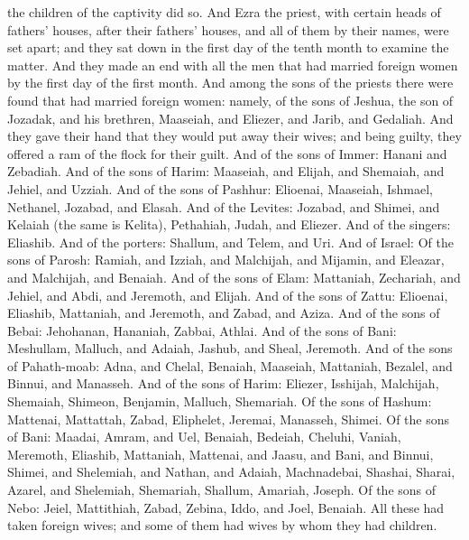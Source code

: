 the children of the captivity did so. And Ezra the priest, with certain heads of fathers’ houses, after their fathers’ houses, and all of them by their names, were set apart; and they sat down in the first day of the tenth month to examine the matter. And they made an end with all the men that had married foreign women by the first day of the first month.  And among the sons of the priests there were found that had married foreign women: namely, of the sons of Jeshua, the son of Jozadak, and his brethren, Maaseiah, and Eliezer, and Jarib, and Gedaliah. And they gave their hand that they would put away their wives; and being guilty, they offered a ram of the flock for their guilt. And of the sons of Immer: Hanani and Zebadiah. And of the sons of Harim: Maaseiah, and Elijah, and Shemaiah, and Jehiel, and Uzziah. And of the sons of Pashhur: Elioenai, Maaseiah, Ishmael, Nethanel, Jozabad, and Elasah.  And of the Levites: Jozabad, and Shimei, and Kelaiah (the same is Kelita), Pethahiah, Judah, and Eliezer.  And of the singers: Eliashib. And of the porters: Shallum, and Telem, and Uri.  And of Israel: Of the sons of Parosh: Ramiah, and Izziah, and Malchijah, and Mijamin, and Eleazar, and Malchijah, and Benaiah. And of the sons of Elam: Mattaniah, Zechariah, and Jehiel, and Abdi, and Jeremoth, and Elijah. And of the sons of Zattu: Elioenai, Eliashib, Mattaniah, and Jeremoth, and Zabad, and Aziza. And of the sons of Bebai: Jehohanan, Hananiah, Zabbai, Athlai. And of the sons of Bani: Meshullam, Malluch, and Adaiah, Jashub, and Sheal, Jeremoth. And of the sons of Pahath-moab: Adna, and Chelal, Benaiah, Maaseiah, Mattaniah, Bezalel, and Binnui, and Manasseh. And of the sons of Harim: Eliezer, Isshijah, Malchijah, Shemaiah, Shimeon, Benjamin, Malluch, Shemariah. Of the sons of Hashum: Mattenai, Mattattah, Zabad, Eliphelet, Jeremai, Manasseh, Shimei. Of the sons of Bani: Maadai, Amram, and Uel, Benaiah, Bedeiah, Cheluhi, Vaniah, Meremoth, Eliashib, Mattaniah, Mattenai, and Jaasu, and Bani, and Binnui, Shimei, and Shelemiah, and Nathan, and Adaiah, Machnadebai, Shashai, Sharai, Azarel, and Shelemiah, Shemariah, Shallum, Amariah, Joseph. Of the sons of Nebo: Jeiel, Mattithiah, Zabad, Zebina, Iddo, and Joel, Benaiah. All these had taken foreign wives; and some of them had wives by whom they had children. 
